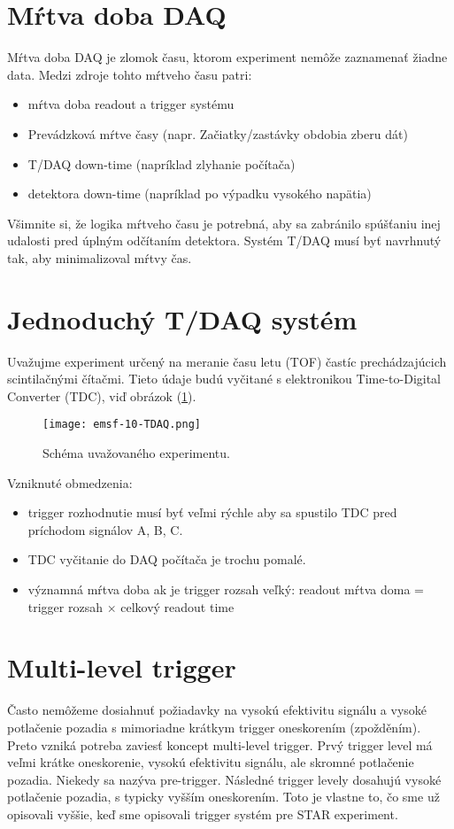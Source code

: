 \documentclass[../../main.tex]{subfiles}
\begin{document}
\section{Mŕtva doba DAQ}
Mŕtva doba DAQ je zlomok času, ktorom experiment nemôže zaznamenať žiadne data. Medzi zdroje tohto mŕtveho času patri:
\begin{itemize}
\item mŕtva doba readout a trigger systému
\item Prevádzková mŕtve časy (napr. Začiatky/zastávky obdobia zberu dát)
\item T/DAQ down-time (napríklad zlyhanie počítača)
\item detektora down-time (napríklad po výpadku vysokého napätia)
\end{itemize}
Všimnite si, že logika mŕtveho času je potrebná, aby sa zabránilo spúšťaniu inej udalosti pred úplným odčítaním detektora. Systém T/DAQ musí byť navrhnutý tak, aby minimalizoval mŕtvy čas.

\section{Jednoduchý T/DAQ systém}
Uvažujme experiment určený na meranie času letu (TOF) častíc prechádzajúcich scintilačnými čítačmi. Tieto údaje budú vyčitané s elektronikou Time-to-Digital Converter (TDC), viď obrázok (\ref{em10:fig:tdaq}).

\begin{figure}[!h]
\texttt{[image: emsf-10-TDAQ.png]}
\centering
\caption{Schéma uvažovaného experimentu.}
\label{em10:fig:tdaq}
\end{figure}

Vzniknuté obmedzenia:
\begin{itemize}
\item trigger rozhodnutie musí byť veľmi rýchle aby sa spustilo TDC pred príchodom signálov A, B, C.
\item TDC vyčitanie do DAQ počítača je trochu pomalé.
\item významná mŕtva doba ak je trigger rozsah veľký: readout mŕtva doma = trigger rozsah $\times$ celkový readout time
\end{itemize}

\section{Multi-level trigger}
Často nemôžeme dosiahnuť požiadavky na vysokú efektivitu signálu a vysoké potlačenie pozadia s mimoriadne krátkym trigger oneskorením (zpožděním). Preto vzniká potreba zaviesť koncept multi-level trigger. Prvý trigger level má veľmi krátke oneskorenie, vysokú efektivitu signálu, ale skromné potlačenie pozadia. Niekedy sa nazýva pre-trigger. Následné trigger levely dosahujú vysoké potlačenie pozadia, s typicky vyšším oneskorením. Toto je vlastne to, čo sme už opisovali vyššie, keď sme opisovali trigger systém pre STAR experiment.
\end{document}
